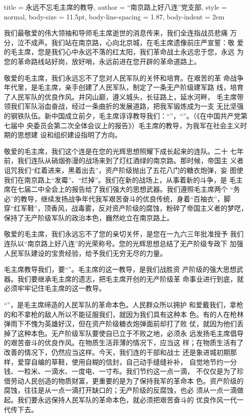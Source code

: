 \begin{hongqiarticle}{
        title  = {永远不忘毛主席的教导},
        author = {“南京路上好八连”党支部},
        style  = normal,
        body-size = 11.5pt,
        body-line-spacing = 1.87,
        body-indent = 2em
    }
    
    我们最敬爱的伟大领袖和导师毛主席逝世的消息传来，我们全连指战员悲痛
    万分，泣不成声。我们站在南京路，心向北京城，在毛主席遗像前庄严宣誓：敬
    爱的毛主席，您是我们心中永远不落的红太阳，我们革命战土永远忠于您，永远
    为您的革命路线站好岗，放好哨，永远前进在您开辟的革命道路上。
    
    敬爱的毛主席，我们永远忘不了您对人民军队的关怀和培育。在艰苦的革
    命战争年代里，是毛主席，亲手创建了人民军队，制定了一条无产阶级建军路
    线，培育了人民军队的优良作风。井冈山巅，遵义城头，长征路上，延水河畔，
    毛主席带领我们军队浴血奋战，经过一条曲折的发展道路，把我军锻炼成为一支
    无比坚强的钢铁队伍。新中国成立前夕，毛主席谆谆教导我们：“”，“”。（《在中国共产党第七届中
    央委员会第二次全体会议上的报告》）毛主席的教导，为我军在社会主义时期的思想建
    设和组织建设指明了方向。
    
    敬爱的毛主席，我们这个连是在您的光辉思想照耀下成长起来的连队。二十
    七年前，我们连队从硝烟弥漫的战场来到了灯红酒绿的南京路。那时候，帝国主
    义者诅咒我们“红着进来，黑着出去”，资产阶级抛出了五花八门的糖衣炮弹，妄
    图使我们在南京路上“发霉”、“烂掉”。我们在新的战场上，从事着新的斗争，是
    毛主席在七届二中全会上的报告给了我们强大的思想武器。我们遵照毛主席两个
    “务必”的教导，继续发扬战争年代我军艰苦奋斗的优良传统，身着“百袖衣”，脚
    穿“红军鞋”，顶香风，战毒雾，反对资产阶级的腐蚀，粉碎了帝国主义者的梦呓，
    保持了无产阶级军队的政治本色，巍然屹立在南京路上。
    
    敬爱的毛主席，我们永远忘不了您的亲切关怀，是您在一九六三年批准授予
    我们连队以“南京路上好八连”的光荣称号。您的光辉思想总结了无产阶级专政下
    加强人民军队建设的宝贵经验，给予我们无穷无尽的力量。
    
    毛主席教导我们，要“”。毛主席的这一教导，是我们战胜资
    产阶级的强大思想武器。我们要继承毛主席的遗志，把毛主席开创的无产阶级革
    命事业进行到底，就必须牢牢记住毛主席的这一教导。
    
    “”，是毛主席缔造的人民军队的革命本色。人民群众所以拥护
    和爱戴我们，拿枪的和不拿枪的敌人所以不能征服我们，就因为我们具有这种本
    色。有的人在枪林弹雨下不愧为英雄好汉，但在资产阶级糖衣炮弹面前却打了败
    仗，就因为他们丢掉了这种本色。无产阶级军队要使自已立于不败之地，必须永
    远发扬毛主席倡导的艰苦奋斗的优良作风。在物质生活菲薄的情况下，应当这
    样；在物质生活有了改善的情况下，仍然应当这样。今天，我们连的干部和战士
    还是象进城初期那样，爱穿自编的草鞋，使用自糊的信封，自己动手缝缝补补，
    自觉地节约一分钱、一粒米、一滴水、一度电、一寸布。我们节约这一点一滴，
    不仅仅是为了珍借劳动人民创造的物质财富，更重要的是为了保持我军的革命本
    色。资产阶级的腐蚀，往往是从一点一滴打开缺口的；无产阶级的反腐蚀，也必
    须从一点一滴做起。我们要永远保持人民军队的革命本色，就必须把艰苦奋斗的
    优良作风一代一代传下去。
    

\end{hongqiarticle}
